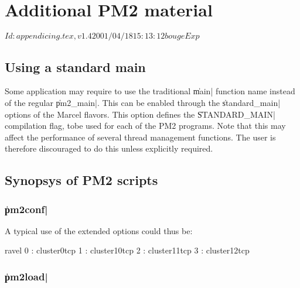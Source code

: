 \chapter{Additional PM2 material}

\stamp $Id: appendicing.tex,v 1.4 2001/04/18 15:13:12 bouge Exp $

\section{Using a standard main}
\label{sec:tradimain}

Some application may require to use the traditional \|main| function
name instead of the regular \|pm2_main|. This can be enabled through
the \|standard_main| options of the Marcel flavors. This option
defines the \|STANDARD_MAIN| compilation flag, tobe used for each of
the PM2 programs. Note that this may affect the performance of several
thread management functions. The user is therefore discouraged to do
this unless explicitly required.

\section{Synopsys of PM2 scripts}
\label{sec:scripts}

\subsection{\|pm2conf|}


A typical use of the extended options could thus be:
\begin{shell}
ravel%
0 : cluster0tcp
1 : cluster10tcp
2 : cluster11tcp
3 : cluster12tcp
\end{shell}

\subsection{\|pm2load|}

